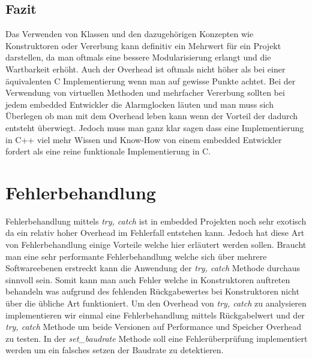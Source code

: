 \documentclass[MES,Master,ngerman]{twbook}%
\begin{document}
\subsection{Fazit}
Das Verwenden von Klassen und den dazugehörigen Konzepten wie Konstruktoren oder Vererbung kann definitiv ein Mehrwert für ein Projekt darstellen, da man oftmals eine bessere Modularisierung erlangt und die Wartbarkeit erhöht. Auch der Overhead ist oftmals nicht höher als bei einer äquivalenten C Implementierung wenn man auf gewisse Punkte achtet. Bei der Verwendung von virtuellen Methoden und mehrfacher Vererbung sollten bei jedem embedded Entwickler die Alarmglocken läuten und man muss sich Überlegen ob man mit dem Overhead leben kann wenn der Vorteil der dadurch entsteht überwiegt. Jedoch muss man ganz klar sagen dass eine Implementierung in C++ viel mehr Wissen und Know-How von einem embedded Entwickler fordert als eine reine funktionale Implementierung in C.

\newpage


\section{Fehlerbehandlung}
Fehlerbehandlung mittels \textit{try, catch} ist in embedded Projekten noch sehr exotisch da ein relativ hoher Overhead im Fehlerfall entstehen kann. Jedoch hat diese Art von Fehlerbehandlung einige Vorteile welche hier erläutert werden sollen. Braucht man eine sehr performante Fehlerbehandlung welche sich über mehrere Softwareebenen erstreckt kann die Anwendung der \textit{try, catch} Methode durchaus sinnvoll sein. Somit kann man auch Fehler welche in Konstruktoren auftreten behandeln was aufgrund des fehlenden Rückgabewertes bei Konstruktoren nicht über die übliche Art funktioniert. \newline\newline Um den Overhead von \textit{try, catch} zu analysieren implementieren wir einmal eine Fehlerbehandlung mittels Rückgabelwert und der \textit{try, catch} Methode um beide Versionen auf Performance und Speicher Overhead zu testen. In der \textit{set\_baudrate} Methode soll eine Fehlerüberprüfung implementiert werden um ein falsches setzen der Baudrate zu detektieren. 

\begin{figure}[!htb]
	\begin{subfigure}[b]{0.5\textwidth}
		
		\label{fig:38}
	\end{subfigure}
	\begin{subfigure}[b]{0.5\textwidth}
		
		\label{fig:39}
	\end{subfigure}
\end{figure}
\end{document}

